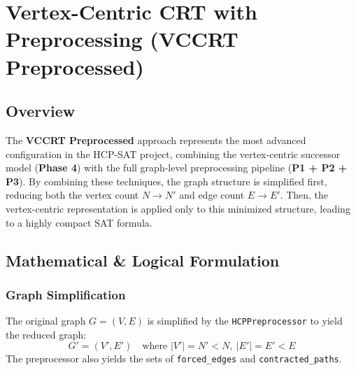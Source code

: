 \section{Vertex-Centric CRT with Preprocessing (VCCRT Preprocessed)}
\label{sec:vccrt_preprocessed}

\subsection{Overview}
The \textbf{VCCRT Preprocessed} approach represents the most advanced configuration in the HCP-SAT project, combining the vertex-centric successor model (\textbf{Phase 4}) with the full graph-level preprocessing pipeline (\textbf{P1 + P2 + P3}).
By combining these techniques, the graph structure is simplified first, reducing both the vertex count $N \to N'$ and edge count $E \to E'$.
Then, the vertex-centric representation is applied only to this minimized structure, leading to a highly compact SAT formula.

\subsection{Mathematical \& Logical Formulation}

\subsubsection{Graph Simplification}
The original graph $G = (V, E)$ is simplified by the \texttt{HCPPreprocessor} to yield the reduced graph:
\begin{equation}
    G' = (V', E') \quad \text{where } |V'| = N' < N, \ |E'| = E' < E
\end{equation}
The preprocessor also yields the sets of \texttt{forced\_edges} and \texttt{contracted\_paths}.

